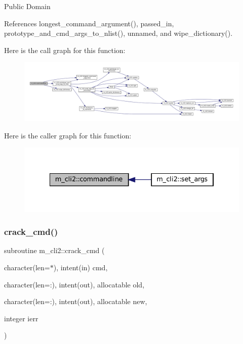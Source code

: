 Public Domain 

References longest\+\_\+command\+\_\+argument(), passed\+\_\+in, prototype\+\_\+and\+\_\+cmd\+\_\+args\+\_\+to\+\_\+nlist(), unnamed, and wipe\+\_\+dictionary().

Here is the call graph for this function\+:\nopagebreak
\begin{figure}[H]
\begin{center}
\leavevmode
\includegraphics[width=350pt]{namespacem__cli2_a85c38a938a7dd9a749daf8effe45c109_cgraph}
\end{center}
\end{figure}
Here is the caller graph for this function\+:\nopagebreak
\begin{figure}[H]
\begin{center}
\leavevmode
\includegraphics[width=334pt]{namespacem__cli2_a85c38a938a7dd9a749daf8effe45c109_icgraph}
\end{center}
\end{figure}
\mbox{\label{namespacem__cli2_a710b26995119aee101959555b1bac8e2}} 
\subsubsection{\texorpdfstring{crack\+\_\+cmd()}{crack\_cmd()}}
{\footnotesize\ttfamily subroutine m\+\_\+cli2\+::crack\+\_\+cmd (\begin{DoxyParamCaption}\item[{character(len=$\ast$), intent(in)}]{cmd,  }\item[{character(len=\+:), intent(out), allocatable}]{old,  }\item[{character(len=\+:), intent(out), allocatable}]{new,  }\item[{integer}]{ierr }\end{DoxyParamCaption})\hspace{0.3cm}{\ttfamily [private]}}



